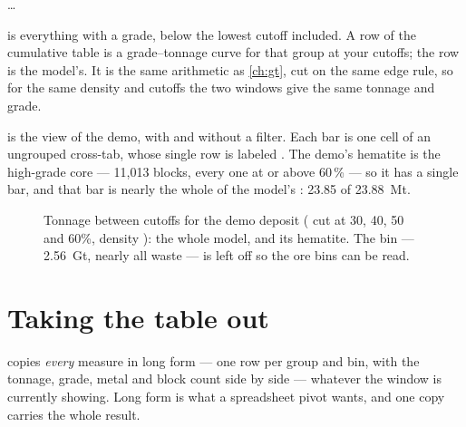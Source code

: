\begin{center}
 \quad {} \quad … \quad {} \quad {} \quad {} \quad {}
\end{center}

 is everything with a grade, below the lowest cutoff included. A row of the cumulative table is a grade–tonnage curve for that group at your cutoffs; the  row is the model's. It is the same arithmetic as \cref{ch:gt}, cut on the same edge rule, so for the same density and cutoffs the two windows give the same tonnage and grade.

 is the  view of the demo, with and without a filter. Each bar is one cell of an ungrouped cross-tab, whose single row is labeled . The demo's hematite is the high-grade core — 11,013 blocks, every one at or above 60\,\% — so it has a single bar, and that bar is nearly the whole of the model's : 23.85 of 23.88~Mt.

\begin{figure}[htbp]\centering
{}
\caption{Tonnage between cutoffs for the demo deposit ( cut at 30, 40, 50 and 60\%, density ): the whole model, and its hematite. The  bin — 2.56~Gt, nearly all waste — is left off so the ore bins can be read.}\label{fig:xtab-demo}
\end{figure}

\section{Taking the table out}\label{sec:xtab-out}
 copies \emph{every} measure in long form — one row per group and bin, with the tonnage, grade, metal and block count side by side — whatever the window is currently showing. Long form is what a spreadsheet pivot wants, and one copy carries the whole result.


